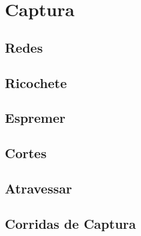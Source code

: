 \part{Captura}











% 
% 
% 
% 
% 
% 

\chapter{Redes}
\emptypage

\chapter{Ricochete}
\emptypage

\chapter{Espremer}
\emptypage

\chapter{Cortes}
\emptypage

\chapter{Atravessar}
\emptypage

\chapter{Corridas de Captura}
\emptypage